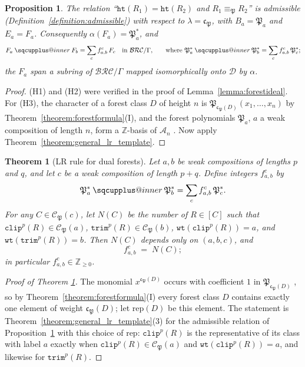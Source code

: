 \documentclass{amsart}
\makeatletter
\newcommand{\sqcupplus@inner}[2]{%
  \vcenter{\hbox{\ooalign{%
    \hfil$\m@th#1\sqcup$\hfil\cr
    \hfil\raisebox{0.15ex}{$\m@th#1\scriptscriptstyle+$}\hfil\cr
  }}}%
}
\newcommand{\sqcupplus}{\mathbin{\mathpalette\sqcupplus@inner\relax}}
\newtheorem{proposition}[lemma]{Proposition}
\newtheorem{theorem}{Theorem}[section]
\theoremstyle{definition}
\theoremstyle{remark}
\numberwithin{equation}{subsection}
\newcommand{\wtt}{\mathtt{wt}}
\newcommand{\trm}{\mathtt{trim}}
\newcommand{\hr}{\mathtt{ht}}
\newcommand{\clp}{\mathtt{clip}}
\newcommand{\BRC}{\mathcal{BRC}}
\newcommand{\coma}{\mathcal{A}}
\newcommand{\dcoma}{\mathcal{D}}
\newcommand{\forest}{\mathfrak{P}}
\newcommand{\fcode}{\mathfrak{c}_\forest}
\makeatother
\begin{document}
\begin{proposition}\label{proposition:forestadmissible}
The relation ``$\hr(R_1)=\hr(R_2)$ and $R_1\equiv_\forest R_2$'' is admissible (Definition~\ref{definition:admissible}) with respect to $\lambda=\fcode$, with $B_a=\forest_a$ and $E_a=F_a$. Consequently $\alpha(F_a)=\forest_a^*$, and
$$F_a\sqcupplus F_b=\sum_cf_{a,b}^c\,F_c\quad\text{in }\BRC/\Gamma\text{,}\qquad\text{where }\forest_a^*\sqcupplus\forest_b^*=\sum_cf_{a,b}^c\,\forest_c^*\text{;}$$
the $F_a$ span a subring of $\BRC/\Gamma$ mapped isomorphically onto $\dcoma$ by $\alpha$.
\end{proposition}
\begin{proof}
(H1) and (H2) were verified in the proof of Lemma~\ref{lemma:forestideal}. For (H3), the character of a forest class $D$ of height $n$ is $\forest_{\fcode(D)}(x_1,\ldots,x_n)$ by Theorem~\ref{theorem:forestformula}(I), and the forest polynomials $\forest_a$, $a$ a weak composition of length $n$, form a $\mathbb{Z}$-basis of $\coma_n$ \cite{nadeau2024forest}. Now apply Theorem~\ref{theorem:general_lr_template}.
\end{proof}

\begin{theorem}[LR rule for dual forests]\label{theorem:LRforest}
Let $a,b$ be weak compositions of lengths $p$ and $q$, and let $c$ be a weak composition of length $p+q$. Define integers $f_{a,b}^c$ by
$$\forest_a^* \sqcupplus \forest_b^* = \sum_{c} f_{a,b}^c\,\forest_c^*.$$
For any $C\in\mathcal{C}_\forest(c)$, let $N(C)$ be the number of $R\in[C]$ such that $\clp^p(R)\in \mathcal{C}_\forest(a)$, $\trm^p(R)\in \mathcal{C}_\forest(b)$, $\wtt(\clp^p(R))=a$, and $\wtt(\trm^p(R))=b$. Then $N(C)$ depends only on $(a,b,c)$, and
$$f_{a,b}^c \;=\; N(C);$$
in particular $f_{a,b}^c\in\mathbb{Z}_{\geq 0}$.
\end{theorem}

\begin{proof}[Proof of Theorem \ref{theorem:LRforest}]
The monomial $x^{\fcode(D)}$ occurs with coefficient $1$ in $\forest_{\fcode(D)}$ \cite{nadeau2024forest}, so by Theorem~\ref{theorem:forestformula}(I) every forest class $D$ contains exactly one element of weight $\fcode(D)$; let $\mathrm{rep}(D)$ be this element. The statement is Theorem~\ref{theorem:general_lr_template}(3) for the admissible relation of Proposition~\ref{proposition:forestadmissible} with this choice of $\mathrm{rep}$: $\clp^p(R)$ is the representative of its class with label $a$ exactly when $\clp^p(R)\in\mathcal{C}_\forest(a)$ and $\wtt(\clp^p(R))=a$, and likewise for $\trm^p(R)$.
\end{proof}
\end{document}
